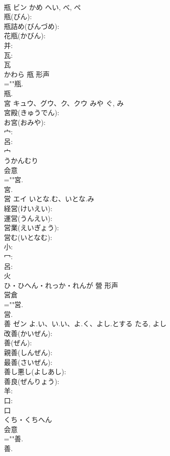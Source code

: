\documentclass[8pt]{extreport}
\begin{document}
\begin{CJK}{UTF8}{min}
\\	瓶	ビン	かめ	へい, べ, ぺ	
\\	瓶(びん): 
\\	瓶詰め(びんづめ): 
\\	花瓶(かびん): 
\\	并: 
\\	瓦: 
\\	瓦	
\\	かわら	甁	形声 
\\	=""瓶.
\\	瓶.
\\	宮	キュウ、グウ、ク、クウ	みや	ぐ, み	
\\	宮殿(きゅうでん): 
\\	お宮(おみや): 
\\	宀: 
\\	呂: 
\\	宀	
\\	うかんむり	
\\	会意 
\\	=""宮.
\\	宮.
\\	営	エイ	いとな.む、いとな.み		
\\	経営(けいえい): 
\\	運営(うんえい): 
\\	営業(えいぎょう): 
\\	営む(いとなむ): 
\\	小: 
\\	冖: 
\\	呂: 
\\	火	
\\	ひ・ひへん・れっか・れんが	營	形声 
\\	営倉 
\\	=""営.
\\	営.
\\	善	ゼン	よ.い、い.い、よ.く、よし.とする	たる, よし	
\\	改善(かいぜん): 
\\	善(ぜん): 
\\	親善(しんぜん): 
\\	最善(さいぜん): 
\\	善し悪し(よしあし): 
\\	善良(ぜんりょう): 
\\	羊: 
\\	口: 
\\	口	
\\	くち・くちへん	
\\	会意 
\\	=""善.
\\	善.

\end{CJK}
\end{document}
